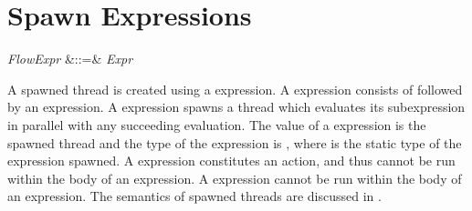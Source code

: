 %
%
%
%

\section{Spawn Expressions}


\begin{Grammar}
\emph{FlowExpr} &::=&  \emph{Expr} \\
\end{Grammar}

A spawned thread is created using a  expression.  A
 expression consists of  followed by an
expression.  A  expression spawns a thread which evaluates
its subexpression in parallel with any succeeding evaluation.  The
value of a  expression is the spawned thread
and the type of the expression is ,
where  is the static type of the expression spawned.
A  expression constitutes an  action, and thus cannot be run
within the body of an  expression.
A  expression cannot be run
within the body of an  expression.
The semantics of spawned threads are discussed in .
